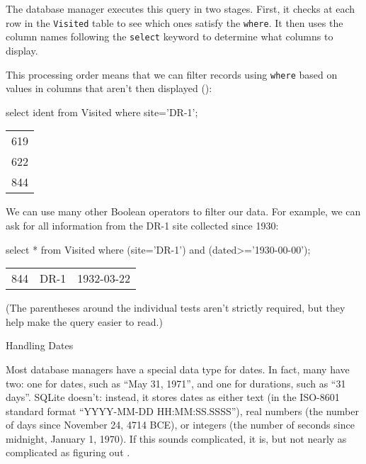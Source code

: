 \documentclass{book}
\begin{document}
The database manager executes this query in two stages. First, it checks
at each row in the \texttt{Visited} table to see which ones satisfy the
\texttt{where}. It then uses the column names following the
\texttt{select} keyword to determine what columns to display.

This processing order means that we can filter records using
\texttt{where} based on values in columns that aren't then displayed
():

\begin{VerbIn}
select ident from Visited where site='DR-1';
\end{VerbIn}

\begin{tabular}{l}
619 \\
622 \\
844 \\
\end{tabular}


We can use many other Boolean operators to filter our data. For example,
we can ask for all information from the DR-1 site collected since 1930:

\begin{VerbIn}
select * from Visited where (site='DR-1') and (dated>='1930-00-00');
\end{VerbIn}

\begin{tabular}{lll}
844 & DR-1 & 1932-03-22 \\
\end{tabular}

(The parentheses around the individual tests aren't strictly required,
but they help make the query easier to read.)

\begin{swcbox}{Handling Dates}

Most database managers have a special data type for dates. In fact, many
have two: one for dates, such as ``May 31, 1971'', and one for
durations, such as ``31 days''. SQLite doesn't: instead, it stores dates
as either text (in the ISO-8601 standard format ``YYYY-MM-DD
HH:MM:SS.SSSS''), real numbers (the number of days since November 24,
4714 BCE), or integers (the number of seconds since midnight, January 1,
1970). If this sounds complicated, it is, but not nearly as complicated
as figuring out
.

\end{swcbox}
\end{document}

